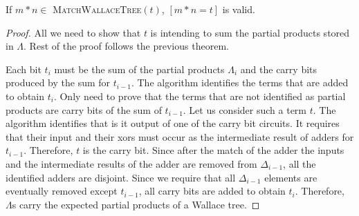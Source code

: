\begin{thm}
  If $m*n\in$ \textsc{MatchWallaceTree}$(t)$, $[m*n = t]$ is valid.
\end{thm}
\begin{proof}
  All we need to show that $t$ is intending to sum the partial products
  stored in $\Lambda$. Rest of the proof follows the previous theorem.
  
  
  Each bit $t_i$ must be the sum of the partial products $\Lambda_i$ and 
  the carry bits produced by the sum for $t_{i-1}$.
  The algorithm identifies the terms that are added to obtain $t_i$.
  Only need to prove that the terms that are not identified as partial products
  are carry bits of the sum of $t_{i-1}$.
  Let us consider such a term $t$.
  The algorithm identifies that is it output of one of the carry bit circuits.
  It requires that their input and their xors must occur
  as the intermediate result of adders for $t_{i-1}$.
  Therefore, $t$ is the carry bit.
  Since after the match of the adder the inputs and the intermediate results
  of the adder are removed from $\Delta_{i-1}$,
  all the identified adders are disjoint.
  Since we require that all $\Delta_{i-1}$ elements are eventually
  removed except $t_{i-1}$, all carry bits are added to obtain $t_i$.
  Therefore, $\Lambda$s carry the expected partial products of a Wallace tree.
\end{proof}


